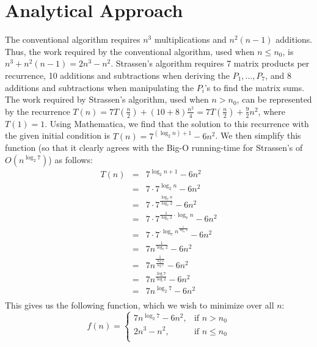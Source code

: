 \documentclass[solution, letterpaper]{cs121}
\begin{document}

\section*{Analytical Approach}

\hspace{4mm} The conventional algorithm requires $n^3$ multiplications and $n^2(n-1)$ additions. Thus, the work required by the conventional algorithm, used when $n \leq n_0$, is $n^3 + n^2(n-1) = 2n^3 - n^2$. Strassen's algorithm requires 7 matrix products per recurrence, 10 additions and subtractions when deriving the $P_1, \ldots, P_7$, and 8 additions and subtractions when manipulating the $P_i$'s to find the matrix sums. The work required by Strassen's algorithm, used when $n > n_0$, can be represented by the recurrence $T(n) = 7T(\frac{n}{2}) + (10+8)\frac{n^2}{4} = 7T(\frac{n}{2}) + \frac{9}{2}n^2$, where $T(1) = 1$. Using Mathematica, we find that the solution to this recurrence with the given initial condition is $T(n) = 7^{(\log_2 n) + 1}-6 n^2$. We then simplify this function (so that it clearly agrees with the Big-O running-time for Strassen's of $O(n^{\log_2 7})$) as follows:
\[
\begin{array}{rcl}
T(n) &=& 7^{\log_2 n + 1} - 6n^2\\
&=& 7 \cdot 7^{\log_2 n} - 6n^2\\
&=& 7 \cdot 7^{\frac{\log_7 n}{\log_7 2}} - 6n^2\\
&=& 7 \cdot 7^{\frac{1}{\log_7 2} \cdot \log_7 n} - 6n^2\\
&=& 7 \cdot 7^{\cdot \log_7 n^{\frac{1}{\log_7 2}}} - 6n^2\\
&=& 7 n^{\frac{1}{\log_7 2}} - 6n^2\\
&=& 7 n^{\frac{1}{\frac{\log 2}{\log 7}}} - 6n^2\\
&=& 7 n^{\frac{\log 7}{\log 2}} - 6n^2\\
&=& 7 n^{\log_2 7} - 6n^2\\
\end{array}
\]
This gives us the following function, which we wish to minimize over all $n$:
\[
    f(n)= 
\begin{cases}
    7 n^{\log_2 7} - 6n^2, & \text{if } n > n_0 \\
    2n^3 - n^2, & \text{if } n \leq n_0\\
\end{cases}
\]
\end{document}
